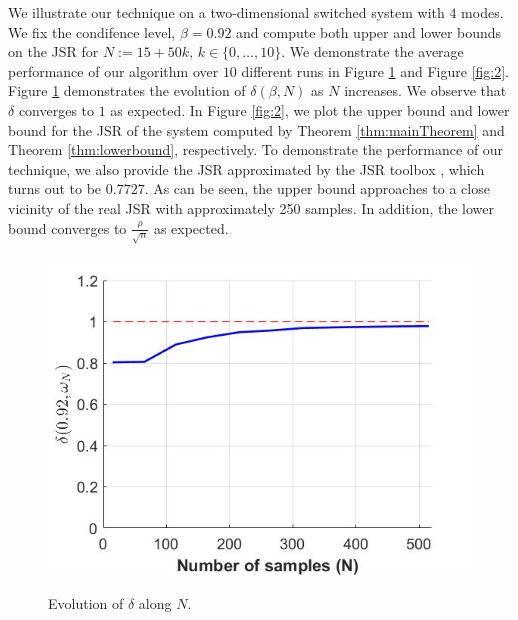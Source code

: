 We illustrate our technique on a two-dimensional switched system with $4$ modes. We fix the condifence level, \mbox{$\beta = 0.92$} and compute both upper and lower bounds on the JSR for $N:=15+50k,\, k \in\{0, \ldots, 10\}.$ We demonstrate the average performance of our algorithm over $10$ different runs in Figure \ref{fig:1} and Figure \ref{fig:2}. Figure \ref{fig:1} demonstrates the evolution of $\delta(\beta, N)$ as $N$ increases. We observe that $\delta$ converges to $1$ as expected. In Figure \ref{fig:2}, we plot the upper bound and lower bound for the JSR of the system computed by Theorem \ref{thm:mainTheorem} and Theorem \ref{thm:lowerbound}, respectively. To demonstrate the performance of our technique, we also provide the JSR approximated by the JSR toolbox \cite{jsrtoolbox}, which turns out to be $0.7727$. As can be seen, the upper bound approaches to a close vicinity of the real JSR with approximately 250 samples. In addition, the lower bound converges to $\frac{\rho}{\sqrt{n}}$ as expected.

\begin{figure}
\begin{center}
\includegraphics[scale=0.35]{delta1.jpg}
\label{fig:1}
\caption{Evolution of $\delta$ along $N$.}
\end{center}
\end{figure}


